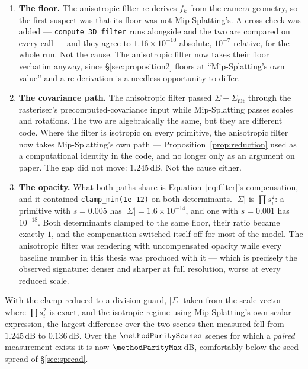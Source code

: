 \begin{enumerate}[leftmargin=1.4em,itemsep=3pt]
  \item \textbf{The floor.} The anisotropic filter re-derives $f_k$ from the camera geometry, so the
        first suspect was that its floor was not Mip-Splatting's. A cross-check
        was added --- \texttt{compute\_3D\_filter} runs alongside and the two are
        compared on every call --- and they agree to $1.16\times10^{-10}$
        absolute, $10^{-7}$ relative, for the whole run. Not the cause. The anisotropic filter now
        takes their floor verbatim anyway, since \S\ref{sec:proposition2} floors
        at ``Mip-Splatting's own value'' and a re-derivation is a needless
        opportunity to differ.
  \item \textbf{The covariance path.} The anisotropic filter passed $\Sigma + \Sigma_{\mathrm{filt}}$
        through the rasteriser's precomputed-covariance input while
        Mip-Splatting passes scales and rotations. The two are algebraically the
        same, but they are different code. Where the filter is isotropic on
        every primitive, the anisotropic filter now takes Mip-Splatting's own path ---
        Proposition~\ref{prop:reduction} used as a computational identity in the code,
        and no longer only as an argument on paper. The gap did not move: $1.245$\,dB. Not the
        cause either.
  \item \textbf{The opacity.} What both paths share is
        Equation~\eqref{eq:filter}'s compensation, and it contained
        \texttt{clamp\_min(1e-12)} on both determinants. $|\Sigma|$ is
        $\prod s_i^2$: a primitive with $s = 0.005$ has $|\Sigma| = 1.6\times
        10^{-14}$, and one with $s=0.001$ has $10^{-18}$. Both determinants
        clamped to the same floor, their ratio became exactly $1$, and the
        compensation switched itself off for most of the model. The anisotropic filter was rendering
        with uncompensated opacity while every baseline number in this thesis
        was produced with it --- which is precisely the observed signature:
        denser and sharper at full resolution, worse at every reduced scale.
\end{enumerate}

With the clamp reduced to a division guard, $|\Sigma|$ taken from the scale
vector where $\prod s_i^2$ is exact, and the isotropic regime using
Mip-Splatting's own scalar expression, the largest difference over the two scenes
then measured fell from $1.245$\,dB to $0.136$\,dB. Over the
$\methodParityScenes$ scenes for which a \emph{paired} measurement exists it is
now $\mathbf{\methodParityMax}$\,dB, comfortably below the seed spread of
\S\ref{sec:spread}.

